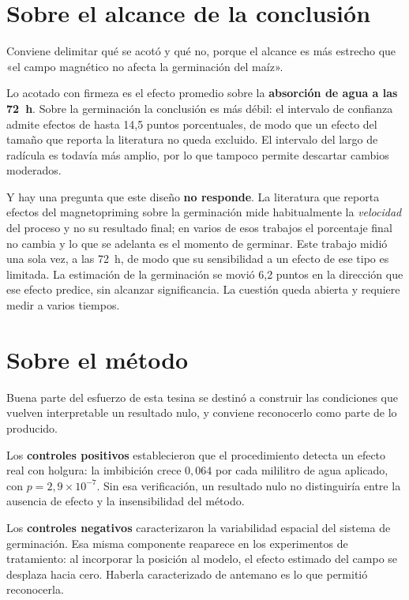 \section*{Sobre el alcance de la conclusión}

Conviene delimitar qué se acotó y qué no, porque el alcance es más estrecho que «el campo magnético no afecta la germinación del maíz».

Lo acotado con firmeza es el efecto promedio sobre la \textbf{absorción de agua a las 72~h}. Sobre la germinación la conclusión es más débil: el intervalo de confianza admite efectos de hasta 14{,}5 puntos porcentuales, de modo que un efecto del tamaño que reporta la literatura no queda excluido. El intervalo del largo de radícula es todavía más amplio, por lo que tampoco permite descartar cambios moderados.

Y hay una pregunta que este diseño \textbf{no responde}. La literatura que reporta efectos del magnetopriming sobre la germinación mide habitualmente la \emph{velocidad} del proceso y no su resultado final; en varios de esos trabajos el porcentaje final no cambia y lo que se adelanta es el momento de germinar. Este trabajo midió una sola vez, a las 72~h, de modo que su sensibilidad a un efecto de ese tipo es limitada. La estimación de la germinación se movió 6{,}2 puntos en la dirección que ese efecto predice, sin alcanzar significancia. La cuestión queda abierta y requiere medir a varios tiempos.

\section*{Sobre el método}

Buena parte del esfuerzo de esta tesina se destinó a construir las condiciones que vuelven interpretable un resultado nulo, y conviene reconocerlo como parte de lo producido.

Los \textbf{controles positivos} establecieron que el procedimiento detecta un efecto real con holgura: la imbibición crece \(0{,}064\) por cada mililitro de agua aplicado, con \(p = 2{,}9\times10^{-7}\). Sin esa verificación, un resultado nulo no distinguiría entre la ausencia de efecto y la insensibilidad del método.

Los \textbf{controles negativos} caracterizaron la variabilidad espacial del sistema de germinación. Esa misma componente reaparece en los experimentos de tratamiento: al incorporar la posición al modelo, el efecto estimado del campo se desplaza hacia cero. Haberla caracterizado de antemano es lo que permitió reconocerla.

